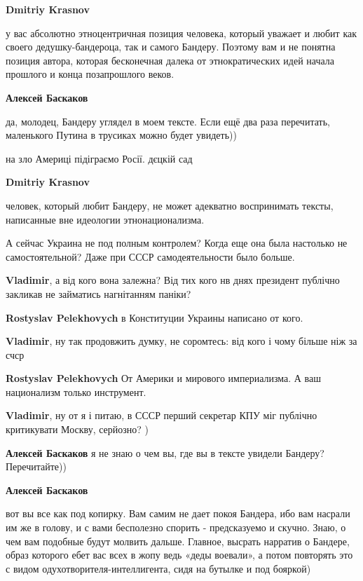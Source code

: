 \begin{itemize}
\begin{itemize} %
\textbf{Dmitriy Krasnov} 

у вас абсолютно этноцентричная позиция человека, который уважает и любит как
своего дедушку-бандероца, так и самого Бандеру. Поэтому вам и не понятна
позиция автора, которая бесконечная далека от этнократических идей начала
прошлого и конца позапрошлого веков.

\textbf{Алексей Баскаков} 

да, молодец, Бандеру углядел в моем тексте. Если ещё два раза перечитать,
маленького Путина в трусиках можно будет увидеть))

на зло Америці підіграємо Росії. дєцкій сад

\textbf{Dmitriy Krasnov} 

человек, который любит Бандеру, не может адекватно воспринимать тексты,
написанные вне идеологии этнонационализма.


А сейчас Украина не под полным контролем? Когда еще она была настолько не
самостоятельной? Даже при СССР самодеятельности было больше.


\textbf{Vladimir}, а від кого вона залежна? Від тих кого нв днях президент публічно закликав не займатись нагнітанням паніки?

\textbf{Rostyslav Pelekhovych} в Конституции Украины написано от кого.

\textbf{Vladimir}, ну так продовжить думку, не соромтесь: від кого і чому більше ніж за счср

\textbf{Rostyslav Pelekhovych} От Америки и мирового империализма. А ваш национализм только инструмент.

\textbf{Vladimir}, ну от я і питаю, в СССР перший секретар КПУ міг публічно критикувати Москву, серйозно? )

\textbf{Алексей Баскаков} я не знаю о чем вы, где вы в тексте увидели Бандеру? Перечитайте))

\textbf{Алексей Баскаков} 

вот вы все как под копирку. Вам самим не дает покоя Бандера, ибо вам насрали им
же в голову, и с вами бесполезно спорить - предсказуемо и скучно. Знаю, о чем
вам подобные будут молвить дальше. Главное, высрать нарратив о Бандере, образ
которого ебет вас всех в жопу ведь «деды воевали», а потом повторять это с
видом одухотворителя-интеллигента, сидя на бутылке и под бояркой)


\end{itemize}
\end{itemize}
